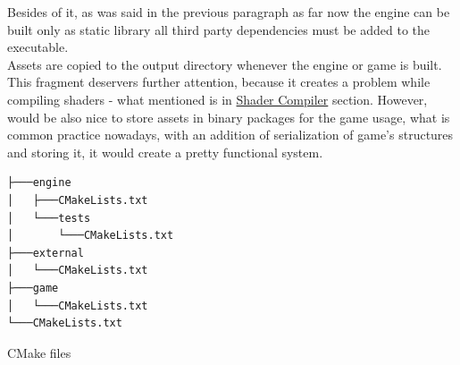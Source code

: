 Besides of it, as was said in the previous paragraph as far now the engine can be built only as static library all third party dependencies must be added to the executable.\\
Assets are copied to the output directory whenever the engine or game is built. This fragment deservers further attention, because it creates a problem while compiling shaders - what mentioned is in \hyperref[problem_with_shader_compilation]{Shader Compiler} section. However, would be also nice to store assets in binary packages for the game usage, what is common practice nowadays, with an addition of serialization of game's structures and storing it, it would create a pretty functional system.

\begin{verbatim}
├───engine
│   ├───CMakeLists.txt
│   └───tests
│       └───CMakeLists.txt
├───external
│   └───CMakeLists.txt
├───game
│   └───CMakeLists.txt
└───CMakeLists.txt
\end{verbatim}
\begin{table}[h]
\caption{CMake files}
\end{table}
\newpage
